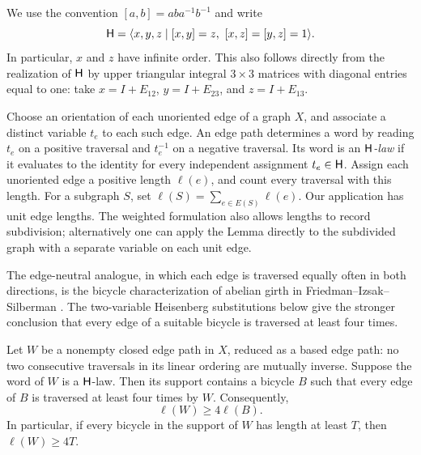 We use the convention $[a,b]=aba^{-1}b^{-1}$ and write
\[
  \mathsf H
  =\langle x,y,z\mid [x,y]=z,\ [x,z]=[y,z]=1\rangle.
\]
In particular, $x$ and $z$ have infinite order.  This also follows directly
from the realization of $\mathsf H$ by upper triangular integral $3\times3$
matrices with diagonal entries equal to one: take
$x=I+E_{12}$, $y=I+E_{23}$, and $z=I+E_{13}$.

Choose an orientation of each unoriented edge of a graph $X$, and associate
a distinct variable $t_e$ to each such edge.  An edge path determines a word
by reading $t_e$ on a positive traversal and $t_e^{-1}$ on a negative
traversal.  Its word is an \emph{$\mathsf H$-law} if it evaluates to the identity
for every independent assignment $t_e\in\mathsf H$.  Assign each unoriented edge
a positive length $\ell(e)$, and count every traversal with this length.
For a subgraph $S$, set $\ell(S)=\sum_{e\in E(S)}\ell(e)$.
Our application has unit edge lengths.  The weighted formulation also
allows lengths to record subdivision; alternatively one can apply the
Lemma directly to the subdivided graph with a separate variable on each
unit edge.

The edge-neutral analogue, in which each edge is traversed equally
often in both directions, is the bicycle characterization of abelian
girth in Friedman--Izsak--Silberman \cite[Lemma~2.6]{FIS15}.
The two-variable Heisenberg substitutions below give the stronger
conclusion that every edge of a suitable bicycle is traversed at least
four times.

\begin{lemma}
\label{lem:heisenberg-law}
Let $W$ be a nonempty closed edge path in $X$, reduced as a based edge
path: no two consecutive traversals in its linear ordering are mutually
inverse.  Suppose the word of $W$ is a $\mathsf H$-law.  Then its support contains
a bicycle $B$ such that every edge of $B$ is traversed at least four times
by $W$.  Consequently,
\[
  \ell(W)\geq 4\ell(B).
\]
In particular, if every bicycle in the support of $W$ has length at least
$T$, then $\ell(W)\geq4T$.
\end{lemma}

